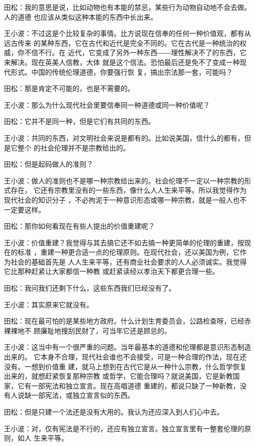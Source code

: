 田松：我的意思是说，比如动物也有本能的禁忌，某些行为动物自动地不会去做。人的道德
也应该从类似这种本能的东西中长出来。


王小波：不过这是个比较复杂的事情。比方说现在信奉的任何一种价值观，都有从远古传来
的某种东西，它在古代和近代是完全不同的。它在古代是一种统治的权威，你不信不行。在
近代，它变成了另外一种东西――理性解决不了的东西，它来解决。现在英美人信教，大体
就是这个信法。恐怕最后还是免不了变成一种现代形式。中国的传统伦理道德，你要强行恢
复，搞出宗法那一套，可能吗？


田松：那是肯定不可能的，也是不需要的。


王小波：那么为什么现代社会里要信奉同一种道德或同一种价值呢？


田松：它并不是同一种，但是它们有共同的东西。


王小波：共同的东西，对文明社会来说是都有的。比如说美国，信什么的都有，但是它整个
的社会伦理并不是宗教给出的。


田松：但是起码做人的准则？


王小波：做人的准则也不是哪一种宗教给出来的。社会伦理不一定以一种宗教的形式存在，
它还有宗教里没有的一些东西，像什么人人生来平等。所以我觉得作为现代社会的知识分子
，不必拘泥于一种意识形态或哪一种宗教，就是一般人也不一定要这样。


田松：那你如何看现在有些人提出的价值重建呢？


王小波：价值重建？我觉得与其去搞它还不如去搞一种更简单的伦理的重建，按现在的标准
，重建一种更合适一点的伦理原则。在现代社会，还以美国为例，它作为社会的基础首先是
人人生来平等，还有商业社会要求的人人必须诚实。我觉得它比那种赶紧让大家都信一种教
或赶紧读经以孝治天下都更合理一些。


田松：我问我们还剩下什么，这些东西我们已经没有了。


王小波：其实原来它就没有。


田松：现在最可怕的是某些地方政府。什么计划生育委员会，公路检查呀，已经赤裸裸地不
顾廉耻地搜刮民财了，可当年它还是顾忌的。


王小波：这当中有一个很严重的问题。当年最基本的道德和伦理都是意识形态制造出来的。
它本身不合理，现代社会谁也不会接受，可是一种合理的作法，现在还没有。一想到价值重
建，就马上想到在古代它是从一种什么宗教，什么哲学恢复出来的，就想赶紧恢复那种宗教
或哲学，它能合理吗？就说美国，它是新教国家，它有一部宪法和独立宣言。现在高唱道德
重建的，都说只缺了一种新教，没有人说缺一部宪法，或独立宣言似的东西。


田松：但是只建一个法还是没有大用的。我认为还应深入到人们心中去。


王小波：对，仅有宪法是不行的，还应有独立宣言。独立宣言里有一整套伦理的原则，如人
生来平等。


